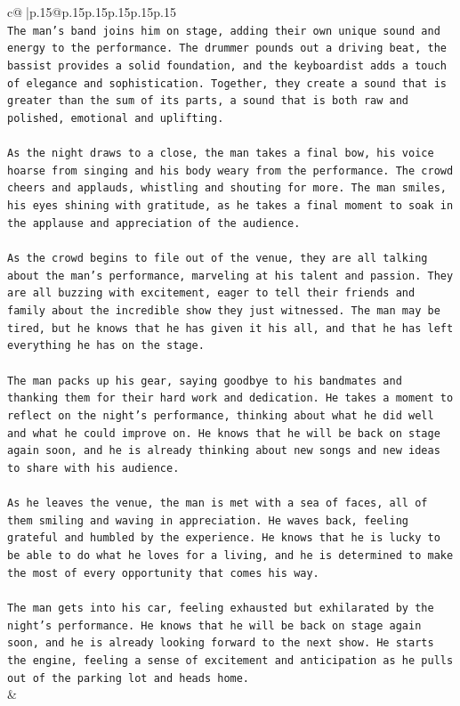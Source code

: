 \documentclass{article}
\begin{document}
{\begin{supertabular}{c@{$\;$}|p{.15\linewidth}@{}p{.15\linewidth}p{.15\linewidth}p{.15\linewidth}p{.15\linewidth}p{.15\linewidth}}
{{{\\ 
\texttt{The man's band joins him on stage, adding their own unique sound and energy to the performance. The drummer pounds out a driving beat, the bassist provides a solid foundation, and the keyboardist adds a touch of elegance and sophistication. Together, they create a sound that is greater than the sum of its parts, a sound that is both raw and polished, emotional and uplifting.} \\
\\ 
\texttt{As the night draws to a close, the man takes a final bow, his voice hoarse from singing and his body weary from the performance. The crowd cheers and applauds, whistling and shouting for more. The man smiles, his eyes shining with gratitude, as he takes a final moment to soak in the applause and appreciation of the audience.} \\
\\ 
\texttt{As the crowd begins to file out of the venue, they are all talking about the man's performance, marveling at his talent and passion. They are all buzzing with excitement, eager to tell their friends and family about the incredible show they just witnessed. The man may be tired, but he knows that he has given it his all, and that he has left everything he has on the stage.} \\
\\ 
\texttt{The man packs up his gear, saying goodbye to his bandmates and thanking them for their hard work and dedication. He takes a moment to reflect on the night's performance, thinking about what he did well and what he could improve on. He knows that he will be back on stage again soon, and he is already thinking about new songs and new ideas to share with his audience.} \\
\\ 
\texttt{As he leaves the venue, the man is met with a sea of faces, all of them smiling and waving in appreciation. He waves back, feeling grateful and humbled by the experience. He knows that he is lucky to be able to do what he loves for a living, and he is determined to make the most of every opportunity that comes his way.} \\
\\ 
\texttt{The man gets into his car, feeling exhausted but exhilarated by the night's performance. He knows that he will be back on stage again soon, and he is already looking forward to the next show. He starts the engine, feeling a sense of excitement and anticipation as he pulls out of the parking lot and heads home.} \\
            }
        }
    }
    & \\ \\


\end{supertabular}}
\end{document}
